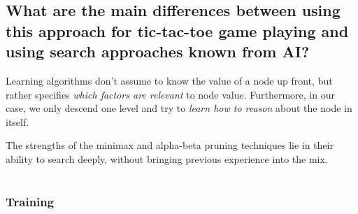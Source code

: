 \documentclass[11pt,a4paper]{article}
\begin{document}
    
    \subsection{What are the main differences between using this approach for tic-tac-toe game playing and using search approaches known from AI?} %
    
      Learning algorithms don't assume to know the value of a node up front, but rather specifies \emph{which factors are relevant} to node value.
      Furthermore, in our case, we only descend one level and try to \emph{learn how to reason} about the node in itself.
      
      The strengths of the minimax and alpha-beta pruning techniques lie in their ability to search deeply, without bringing previous experience into the mix.
    
  
  
  \section{} %
  \label{sec3}
  
    \subsection{} %
    \label{sub3_1}
    
      \subsubsection*{Training}
    
\end{document}
